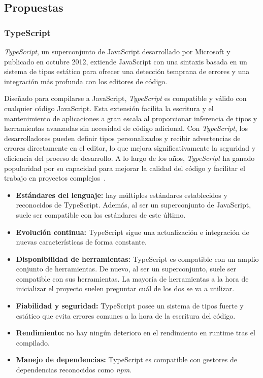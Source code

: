 \subsection{Propuestas}

\subsubsection{TypeScript}

\textit{TypeScript}, un superconjunto de JavaScript desarrollado por Microsoft y publicado en octubre 2012, extiende JavaScript con una sintaxis basada en un sistema de tipos estático para ofrecer una detección temprana de errores y una integración más profunda con los editores de código.

Diseñado para compilarse a JavaScript, \textit{TypeScript} es compatible y válido con cualquier código JavaScript. Esta extensión facilita la escritura y el mantenimiento de aplicaciones a gran escala al proporcionar inferencia de tipos y herramientas avanzadas sin necesidad de código adicional. Con \textit{TypeScript}, los desarrolladores pueden definir tipos personalizados y recibir advertencias de errores directamente en el editor, lo que mejora significativamente la seguridad y eficiencia del proceso de desarrollo. A lo largo de los años, \textit{TypeScript} ha ganado popularidad por su capacidad para mejorar la calidad del código y facilitar el trabajo en proyectos complejos~\cite{typescript-wiki}.

\begin{itemize}
    \item[\bien] \textbf{Estándares del lenguaje:} hay múltiples estándares establecidos y reconocidos de TypeScript. Además, al ser un superconjunto de JavaScript, suele ser compatible con los estándares de este último.
    \item[\bien] \textbf{Evolución continua:} TypeScript sigue una actualización e integración de nuevas características de forma constante.
    \item[\esp] \textbf{Disponibilidad de herramientas:} TypeScript es compatible con un amplio conjunto de herramientas. De nuevo, al ser un superconjunto, suele ser compatible con sus herramientas. La mayoría de herramientas a la hora de inicializar el proyecto suelen preguntar cuál de los dos se va a utilizar.
    \item[\esp] \textbf{Fiabilidad y seguridad:} TypeScript posee un sistema de tipos fuerte y estático que evita errores comunes a la hora de la escritura del código.
    \item[\bien] \textbf{Rendimiento:} no hay ningún deterioro en el rendimiento en runtime tras el compilado.
    \item[\bien] \textbf{Manejo de dependencias:} TypeScript es compatible con gestores de dependencias reconocidos como \textit{npm}.
\end{itemize}

